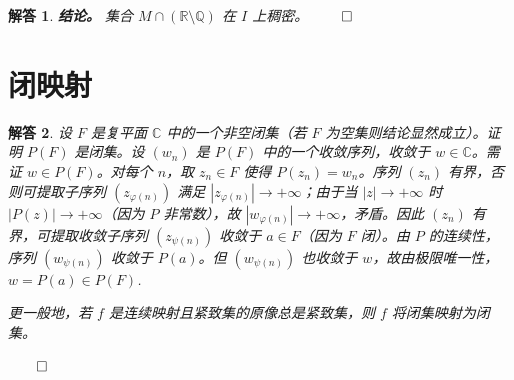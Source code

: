 \documentclass[12pt,UTF8,fontset=none]{ctexbook}
\theoremstyle{exercisestyle}
\theoremstyle{solutionstyle}
\newtheorem*{solution*}{解答}
\newenvironment{solution}
  {\begin{solution*}}
  {\hfill\ensuremath{\qed}\end{solution*}}
\begin{document}
\begin{solution}
  \textbf{结论。} 集合 \( M \cap (\mathbb{R} \setminus \mathbb{Q}) \) 在 \( I \) 上稠密。
\end{solution}

\section{闭映射}\label{application-fermee}
\begin{solution}
  设 \( F \) 是复平面 \( \mathbb{C} \) 中的一个非空闭集（若 \( F \) 为空集则结论显然成立）。证明 \( P(F) \) 是闭集。设 \( (w_n) \) 是 \( P(F) \) 中的一个收敛序列，收敛于 \( w \in \mathbb{C} \)。需证 \( w \in P(F) \)。对每个 \( n \)，取 \( z_n \in F \) 使得 \( P(z_n) = w_n \)。序列 \( (z_n) \) 有界，否则可提取子序列 \( (z_{\varphi(n)}) \) 满足 \( |z_{\varphi(n)}| \to +\infty \)；由于当 \( |z| \to +\infty \) 时 \( |P(z)| \to +\infty \)（因为 \( P \) 非常数），故 \( |w_{\varphi(n)}| \to +\infty \)，矛盾。因此 \( (z_n) \) 有界，可提取收敛子序列 \( (z_{\psi(n)}) \) 收敛于 \( a \in F \)（因为 \( F \) 闭）。由 \( P \) 的连续性，序列 \( (w_{\psi(n)}) \) 收敛于 \( P(a) \)。但 \( (w_{\psi(n)}) \) 也收敛于 \( w \)，故由极限唯一性，\( w = P(a) \in P(F) \).

  更一般地，若 \( f \) 是连续映射且紧致集的原像总是紧致集，则 \( f \) 将闭集映射为闭集。

\end{solution}
\end{document}
